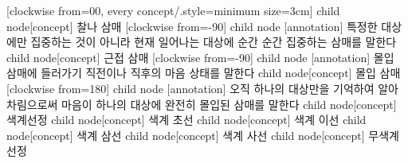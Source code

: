 \documentclass[12pt, a3paper, landscape, oneside]{book}
\begin{document}
		\begin{center}
		\tikz[	mindmap,
				text width=6em, 
				concept color=black!80,
				level 1/.style={level distance=5.5cm,sibling angle=90},  %
				level 2/.style={level distance=4.0cm,sibling angle=30},  %
				level 3/.style={level distance=4.0cm,sibling angle=40},  %
				concept/.append style={fill={none}} 
				]
						[clockwise from=00, every concept/.style={minimum size=3cm}]
				child	{					node[concept] 	{찰나 삼매}
						[clockwise from=-90]
						child	{		node [annotation] {특정한 대상에만 집중하는 것이 아니라 현재 일어나는  대상에 순간 순간 집중하는 삼매를 말한다 }
							}
					}
				child	{	node[concept] 	{근접 삼매}
						[clockwise from=-90]
						child	{		node [annotation] {몰입 삼매에 들러가기 직전이나 직후의 마음 상태를 말한다}
							}
					}
				child	{				node[concept] 	{몰입 삼매}
									[clockwise from=180]
						child	{		node [annotation] {오직 하나의 대상만을 기억하여 알아차림으로써 마음이 하나의 대상에 완전히 몰입된 삼매를 말한다 }
							}
							child	{	node[concept] 	{색계선정}
							child		{ node[concept] {색계 초선}}  
							child		{ node[concept] {색계 이선}}    
							child		{ node[concept] {색계 삼선}}   
							child		{ node[concept] {색계 사선}} 
								}
							child	{	node[concept] 	{무색계선정}
}}
\end{center}
\end{document}
